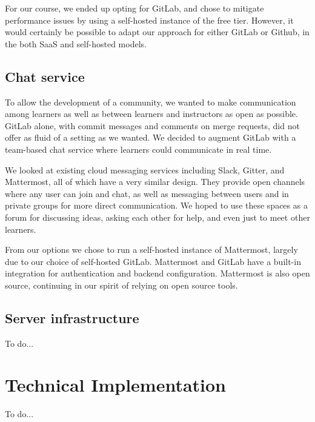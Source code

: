 \documentclass[12pt,twoside,vi]{mitthesis}
\newcommand{\wip}[1]{{\color{red} To do...}}
\begin{document}
For our course, we ended up opting for GitLab, and chose to mitigate performance issues by using a self-hosted instance of the free tier. However, it would certainly be possible to adapt our approach for either GitLab or Github, in the both SaaS and self-hosted models.

\subsection{Chat service}

To allow the development of a community, we wanted to make communication among learners as well as between learners and instructors as open as possible. GitLab alone, with commit messages and comments on merge requests, did not offer as fluid of a setting as we wanted. We decided to augment GitLab with a team-based chat service where learners could communicate in real time.

We looked at existing cloud messaging services including Slack, Gitter, and Mattermost, all of which have a very similar design. They provide open channels where any user can join and chat, as well as messaging between users and in private groups for more direct communication. We hoped to use these spaces as a forum for discussing ideas, asking each other for help, and even just to meet other learners.

From our options we chose to run a self-hosted instance of Mattermost, largely due to our choice of self-hosted GitLab. Mattermost and GitLab have a built-in integration for authentication and backend configuration. Mattermost is also open source, continuing in our spirit of relying on open source tools.

\subsection{Server infrastructure}

\wip{reliance on other software (letsencrypt, nginx, python and javascript, bash)}

\section{Technical Implementation}

\wip{In this section we outline the initial implementation of the platform. We assume a technical background, in particular familiarity with Internet architecture and git.
6.1 Server configuration
DigitalOcean droplet https://www.digitalocean.com/community/tutorials/how-to-install-and-configure-gitlab-on-ubuntu-16-04 
GitLab [built in for DO]
NameCheap domain and networking
nginx customization
Lets encrypt
6.2 Repo architecture
Brief overview of possibilities
Step by step description of how it all worked
6.3 Scripts
As much as possible, git-related operations of the platform were automated to ease the burden on the instructors. 
Onboarding membership request poller
Onboarding group creation
Health check with email notifications
Create subtrees
Create merge request
Merge
Analyze progress}
\end{document}
